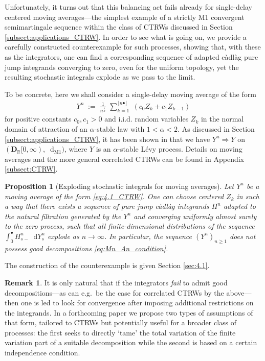 \documentclass[11pt]{article}
\newtheorem{prop}[theorem]{Proposition}
\theoremstyle{definition}\newtheorem{example}[theorem]{Example}
\theoremstyle{definition}\newtheorem{counterexample}[theorem]{Counterexample}
\theoremstyle{definition}\newtheorem{remark}[theorem]{Remark}
\theoremstyle{definition}\newtheorem{defi}[theorem]{Definition}
\numberwithin{equation}{section}
\newcommand*\diff{\mathop{}\!\mathrm{d}}								%
\renewcommand{\|}{\; : \, \;}											%
\newcommand{\dM}{\diff_{\operatorname{M1}}}							%
\begin{document}
Unfortunately, it turns out that this balancing act fails already for single-delay centered moving averages---the simplest example of a strictly M1 convergent semimartingale sequence within the class of CTRWs discussed in Section \ref{subsect:applications_CTRW}. In order to see what is going on, we provide a carefully constructed counterexample for such processes, showing that, with these as the integrators, one can find a corresponding sequence of adapted càdlàg pure jump integrands converging to zero, even for the uniform topology, yet the resulting stochastic integrals explode as we pass to the limit.

To be concrete, here we shall consider a single-delay moving average of the form
\begin{align} Y^n \; := \;  \frac{1}{n^{\frac1\alpha}} \; \sum_{k=1}^{\lfloor n \bullet \rfloor} \; (c_0Z_k + c_1 Z_{k-1}) \label{eq:4.1_CTRW}
\end{align}
for positive constants $c_0,c_1>0$ and i.i.d. random variables $Z_k$ in the normal domain of attraction of an $\alpha$-stable law with $1<\alpha<2$. As discussed in Section \ref{subsect:applications_CTRW}, it has been shown in \cite{avram} that we have $Y^n \Rightarrow Y$ on $(\mathbf{D}_{\mathbb{R}}[0,\infty), \dM)$, where $Y$ is an $\alpha$-stable Lévy process. Details on moving averages and the more general correlated CTRWs can be found in Appendix \ref{subsect:CTRW}.

\begin{prop}[Exploding stochastic integrals for moving averages] \label{counterexample:3.4}
	Let $Y^n$ be a moving average of the form \eqref{eq:4.1_CTRW}. One can choose centered $Z_k$ in such a way that there exists a sequence of pure jump càdlàg integrands $H^n$ adapted to the natural filtration generated by the $Y^n$ and converging uniformly almost surely to the zero process, such that all finite-dimensional distributions of the sequence $\int_0^\bullet H^n_{s-} \diff Y^n_s$ explode as $n\rightarrow \infty$. In particular, the sequence $(Y^n)_{n\ge 1}$ does \emph{not} possess good decompositions \eqref{eq:Mn_An_condition}.
\end{prop}

The construction of the counterexample is given Section \ref{sec:4.1}.

\begin{remark}It is only natural that if the integrators \emph{fail} to admit good decompositions---as can e.g.~be the case for correlated CTRWs by the above---then one is led to look for convergence after imposing additional restrictions on the integrands. In a forthcoming paper \cite{andreasfabrice} we propose two types of assumptions of that form, tailored to CTRWs but potentially useful for a broader class of processes: the first seeks to directly `tame' the total variation of the finite variation part of a suitable decomposition while the second is based on a certain independence condition.
\end{remark}
\end{document}
